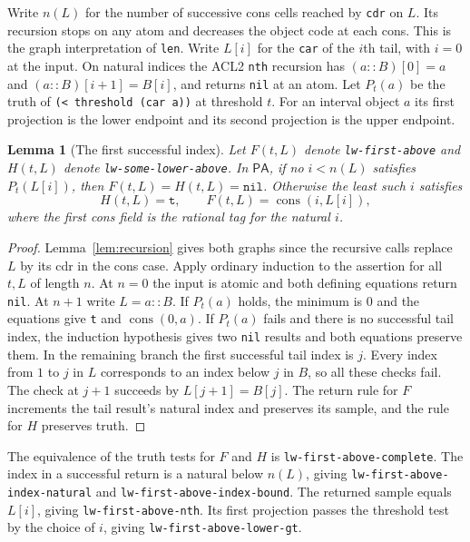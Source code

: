 \documentclass[11pt]{amsart}
\newtheorem{lemma}[theorem]{Lemma}
\theoremstyle{definition}
\theoremstyle{remark}
\numberwithin{equation}{section}
\newcommand{\PA}{\mathsf{PA}}
\newcommand{\code}[1]{\nolinkurl{#1}}
\begin{document}
Write $n(L)$ for the number of successive cons cells reached by
\texttt{cdr} on $L$. Its recursion stops on any atom and decreases
the object code at each cons. This is the graph interpretation of
\texttt{len}. Write $L[i]$ for the \texttt{car} of the $i$th tail,
with $i=0$ at the input. On natural indices the ACL2 \texttt{nth}
recursion has
$(a\mathbin{::}B)[0]=a$ and $(a\mathbin{::}B)[i+1]=B[i]$,
and returns \texttt{nil} at an atom. Let $P_t(a)$ be the truth of
\texttt{(< threshold (car a))} at threshold $t$.
For an interval object $a$ its first projection is the lower
endpoint and its second projection is the upper endpoint.

\begin{lemma}[The first successful index]
\label{lem:first-above}
Let $F(t,L)$ denote \code{lw-first-above} and $H(t,L)$ denote
\code{lw-some-lower-above}. In $\PA$, if no $i<n(L)$ satisfies
$P_t(L[i])$, then $F(t,L)=H(t,L)=\texttt{nil}$. Otherwise the
least such $i$ satisfies
\[
  H(t,L)=\texttt{t},\qquad
  F(t,L)=\operatorname{cons}(i,L[i]),
\]
where the first cons field is the rational tag for the natural $i$.
\end{lemma}
\begin{proof}
Lemma~\ref{lem:recursion} gives both graphs since the recursive
calls replace $L$ by its cdr in the cons case. Apply ordinary
induction to the assertion for all $t,L$ of length $n$.
At $n=0$ the input is atomic and both defining equations return
\texttt{nil}. At $n+1$ write $L=a\mathbin{::}B$. If $P_t(a)$ holds,
the minimum is $0$ and the equations give \texttt{t} and
$\operatorname{cons}(0,a)$. If $P_t(a)$ fails and there is no
successful tail index, the induction hypothesis gives two
\texttt{nil} results and both equations preserve them.
In the remaining branch the first successful tail index is $j$.
Every index from $1$ to $j$ in $L$ corresponds to an index
below $j$ in $B$, so all these checks fail. The check at
$j+1$ succeeds by $L[j+1]=B[j]$. The return rule for $F$ increments
the tail result's natural index and preserves its sample, and
the rule for $H$ preserves truth.
\end{proof}

The equivalence of the truth tests for $F$ and $H$ is
\code{lw-first-above-complete}. The index in a successful return
is a natural below $n(L)$, giving \code{lw-first-above-index-natural}
and \code{lw-first-above-index-bound}. The returned sample equals
$L[i]$, giving \code{lw-first-above-nth}. Its first projection passes
the threshold test by the choice of $i$, giving
\code{lw-first-above-lower-gt}.
\end{document}
